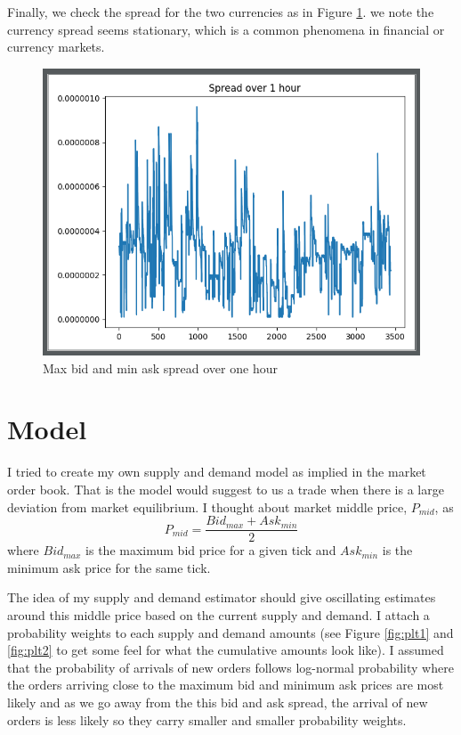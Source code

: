 \documentclass[12pt]{article}
\begin{document}
Finally, we check the spread for the two currencies as in Figure \ref{fig:plt4}.  we note the currency spread seems stationary, which is a common phenomena in financial or currency markets.

\begin{figure}[h!]
	\centering
  \includegraphics[scale=0.5]{plot4.png}
  \caption{Max bid and min ask spread over one hour}
  \label{fig:plt4}
\end{figure}

\FloatBarrier
\section*{Model}
I tried to create my own supply and demand  model as implied in the market order book. That is the model would suggest to us a trade when there is a large deviation from market equilibrium. I thought about market middle price, $P_{mid}$, as
\[
	P_{mid} = \frac{Bid_{max} + Ask_{min}}{2}
\]
where $Bid_{max}$ is the maximum bid price for a given tick and $Ask_{min}$ is the minimum ask price for the same tick.

The idea of my supply and demand estimator should give oscillating estimates around this middle price based on the current supply and demand. I attach a probability weights to each supply and demand amounts (see Figure \ref{fig:plt1} and \ref{fig:plt2} to get some feel for what the cumulative amounts look like). I assumed that the probability of arrivals of new orders follows log-normal probability where the orders arriving close to the maximum bid and minimum ask prices are most likely and as we go away from the this bid and ask spread, the arrival of new orders is less likely so they carry smaller and smaller probability weights.
\end{document}
